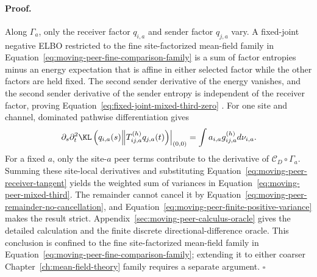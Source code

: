 \paragraph{Proof.}
Along \(\Gamma_a\), only the receiver factor \(q_{i,a}\) and sender factor \(q_{j,a}\) vary. A fixed-joint negative ELBO restricted to the fine site-factorized mean-field family in Equation~\eqref{eq:moving-peer-fine-comparison-family} is a sum of factor entropies minus an energy expectation that is affine in either selected factor while the other factors are held fixed. The second sender derivative of the energy vanishes, and the second sender derivative of the sender entropy is independent of the receiver factor, proving Equation~\eqref{eq:fixed-joint-mixed-third-zero} \citep{Wainwright2008}. For one site and channel, dominated pathwise differentiation gives
\begin{equation}
\left.\partial_s\partial_t^2
\KL\left(q_{i,a}(s)\middle\Vert
T_{ij,a}^{(h)}q_{j,a}(t)\right)\right|_{(0,0)}
=\int a_{i,a}g_{ij,a}^{(h)}d\nu_{i,a}.
\label{eq:moving-peer-derivative-calculation}
\end{equation}
For a fixed \(a\), only the site-\(a\) peer terms contribute to the derivative of \(\mathcal C_D\circ\Gamma_a\). Summing these site-local derivatives and substituting Equation~\eqref{eq:moving-peer-receiver-tangent} yields the weighted sum of variances in Equation~\eqref{eq:moving-peer-mixed-third}. The remainder cannot cancel it by Equation~\eqref{eq:moving-peer-remainder-no-cancellation}, and Equation~\eqref{eq:moving-peer-finite-positive-variance} makes the result strict. Appendix~\ref{sec:moving-peer-calculus-oracle} gives the detailed calculation and the finite discrete directional-difference oracle. This conclusion is confined to the fine site-factorized mean-field family in Equation~\eqref{eq:moving-peer-fine-comparison-family}; extending it to either coarser Chapter~\ref{ch:mean-field-theory} family requires a separate argument. \(\square\)

